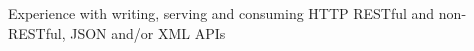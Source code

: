 \item Experience with writing, serving and consuming HTTP RESTful and non-RESTful, JSON and/or XML APIs
